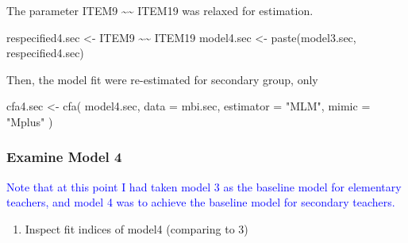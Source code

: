 \documentclass[
]{article}
\newenvironment{Shaded}{\begin{snugshade}}{\end{snugshade}}
\newcommand{\AttributeTok}[1]{\textcolor[rgb]{0.77,0.63,0.00}{#1}}
\newcommand{\FunctionTok}[1]{\textcolor[rgb]{0.00,0.00,0.00}{#1}}
\newcommand{\NormalTok}[1]{#1}
\newcommand{\OtherTok}[1]{\textcolor[rgb]{0.56,0.35,0.01}{#1}}
\newcommand{\StringTok}[1]{\textcolor[rgb]{0.31,0.60,0.02}{#1}}
\providecommand{\tightlist}{%
  \setlength{\itemsep}{0pt}\setlength{\parskip}{0pt}}
\begin{document}
The parameter ITEM9 \textasciitilde\textasciitilde{} ITEM19 was relaxed for estimation.

\begin{Shaded}
\begin{Highlighting}[]
\NormalTok{respecified4.sec }\OtherTok{\textless{}{-}} \StringTok{\textquotesingle{}ITEM9 \textasciitilde{}\textasciitilde{} ITEM19}
\StringTok{                 \textquotesingle{}}
\NormalTok{model4.sec }\OtherTok{\textless{}{-}} \FunctionTok{paste}\NormalTok{(model3.sec, respecified4.sec)}
\end{Highlighting}
\end{Shaded}

Then, the model fit were re-estimated for secondary group, only

\begin{Shaded}
\begin{Highlighting}[]
\NormalTok{cfa4.sec }\OtherTok{\textless{}{-}} 
  \FunctionTok{cfa}\NormalTok{(}
\NormalTok{    model4.sec, }
    \AttributeTok{data =}\NormalTok{ mbi.sec,  }
    \AttributeTok{estimator =} \StringTok{"MLM"}\NormalTok{,}
    \AttributeTok{mimic =} \StringTok{"Mplus"}
\NormalTok{    )}
\end{Highlighting}
\end{Shaded}

\hypertarget{examine-model-4}{%
\subsubsection{Examine Model 4}\label{examine-model-4}}

\textcolor{blue}{Note that at this point I had taken model 3 as the baseline model for elementary teachers, and model 4 was to achieve the baseline model for secondary teachers.}

\begin{enumerate}
\def\labelenumi{(\arabic{enumi})}
\tightlist
\item
  Inspect fit indices of model4 (comparing to 3)
\end{enumerate}
\end{document}
